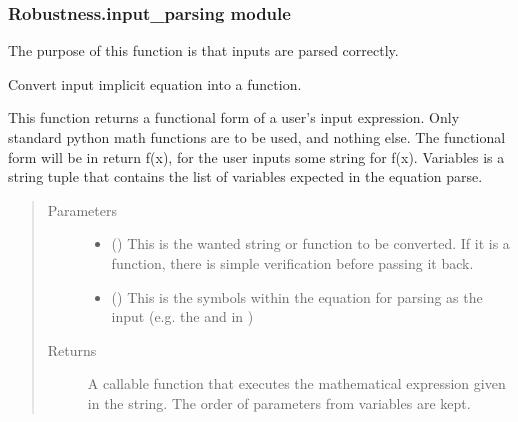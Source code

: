 \documentclass[letterpaper,10pt,english]{sphinxmanual}
\begin{document}
\subsubsection{Robustness.input\_parsing module}
\label{\detokenize{Robustness.input_parsing:module-Robustness.input_parsing}}\label{\detokenize{Robustness.input_parsing:robustness-input-parsing-module}}\label{\detokenize{Robustness.input_parsing::doc}}
The purpose of this function is that inputs are parsed correctly.

\begin{fulllineitems}
\label{\detokenize{Robustness.input_parsing:Robustness.input_parsing.user_equation_parse}}
Convert input implicit equation into a function.

This function returns a functional form of a user’s input expression.
Only standard python math functions are to be used, and nothing else.
The functional form will be in return f(x), for the user inputs some string
for f(x). Variables is a string tuple that contains the list of variables
expected in the equation parse.
\begin{quote}\begin{description}
\item[{Parameters}] \leavevmode\begin{itemize}
\item {} 
 () \textendash{} This is the wanted string or function to be converted. If it is a
function, there is simple verification before passing it back.

\item {} 
 () \textendash{} This is the symbols within the equation for parsing as the input (e.g.
the  and  in )

\end{itemize}

\item[{Returns}] \leavevmode
{} \textendash{} A callable function that executes the mathematical expression given in
the string. The order of parameters from variables are kept.


\end{description}
\end{quote}
\end{fulllineitems}
\end{document}
